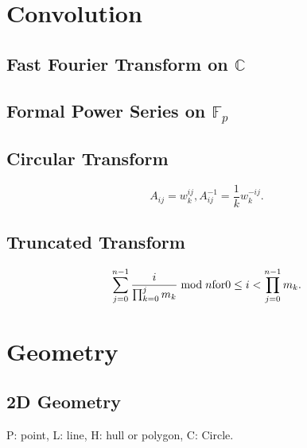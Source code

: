 \documentclass{article}
\begin{document}
\begin{multicols}{2}
    \section{Convolution}
    \subsection{Fast Fourier Transform on $\mathbb{C}$}
    
    \subsection{Formal Power Series on $\mathbb{F}_p$}
    
    
    \subsection{Circular Transform}
    $$A_{ij}=w_k^{ij}, A^{-1}_{ij}=\frac{1}{k}w_k^{-ij}.$$
    \subsection{Truncated Transform}
    $$\sum_{j=0}^{n-1}\frac{i}{\prod_{k=0}^{j}m_k}\bmod n {\rm for} 0\le i < \prod_{j=0}^{n-1}m_k.$$

    \section{Geometry}
    
    \subsection{2D Geometry}
    P: point, L: line, H: hull or polygon, C: Circle.
    
\end{multicols}
\end{document}
